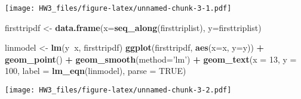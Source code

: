 \documentclass[]{article}
\newenvironment{Shaded}{\begin{snugshade}}{\end{snugshade}}
\newcommand{\KeywordTok}[1]{\textcolor[rgb]{0.13,0.29,0.53}{\textbf{#1}}}
\newcommand{\DataTypeTok}[1]{\textcolor[rgb]{0.13,0.29,0.53}{#1}}
\newcommand{\DecValTok}[1]{\textcolor[rgb]{0.00,0.00,0.81}{#1}}
\newcommand{\StringTok}[1]{\textcolor[rgb]{0.31,0.60,0.02}{#1}}
\newcommand{\OtherTok}[1]{\textcolor[rgb]{0.56,0.35,0.01}{#1}}
\newcommand{\OperatorTok}[1]{\textcolor[rgb]{0.81,0.36,0.00}{\textbf{#1}}}
\newcommand{\NormalTok}[1]{#1}
\begin{document}
\texttt{[image: HW3\_files/figure-latex/unnamed-chunk-3-1.pdf]}

\begin{Shaded}
\begin{Highlighting}[]
\NormalTok{firsttripdf <-}\StringTok{ }\KeywordTok{data.frame}\NormalTok{(}\DataTypeTok{x=}\KeywordTok{seq_along}\NormalTok{(firsttriplist), }\DataTypeTok{y=}\NormalTok{firsttriplist)}

\NormalTok{linmodel <-}\StringTok{ }\KeywordTok{lm}\NormalTok{(y}\OperatorTok{~}\NormalTok{x, firsttripdf)}
\KeywordTok{ggplot}\NormalTok{(firsttripdf, }\KeywordTok{aes}\NormalTok{(}\DataTypeTok{x=}\NormalTok{x, }\DataTypeTok{y=}\NormalTok{y)) }\OperatorTok{+}
\KeywordTok{geom_point}\NormalTok{() }\OperatorTok{+}
\KeywordTok{geom_smooth}\NormalTok{(}\DataTypeTok{method=}\StringTok{'lm'}\NormalTok{) }\OperatorTok{+}
\KeywordTok{geom_text}\NormalTok{(}\DataTypeTok{x =} \DecValTok{13}\NormalTok{, }\DataTypeTok{y =} \DecValTok{100}\NormalTok{, }\DataTypeTok{label =} \KeywordTok{lm_eqn}\NormalTok{(linmodel), }\DataTypeTok{parse =} \OtherTok{TRUE}\NormalTok{)}
\end{Highlighting}
\end{Shaded}

\texttt{[image: HW3\_files/figure-latex/unnamed-chunk-3-2.pdf]}
\end{document}
